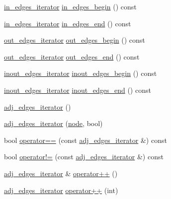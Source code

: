 \begin{DoxyCompactItemize}
\mbox{\hyperlink{classnode_a9a96be92add7c1a2771bcd0431ebf8ab}{in\+\_\+edges\+\_\+iterator}} \mbox{\hyperlink{classnode_a0c32377f370ae52ed2134ff8d4dac584}{in\+\_\+edges\+\_\+begin}} () const
\item 
\mbox{\hyperlink{classnode_a9a96be92add7c1a2771bcd0431ebf8ab}{in\+\_\+edges\+\_\+iterator}} \mbox{\hyperlink{classnode_a785cd330f8b4c5c47d3b6e936a7e744e}{in\+\_\+edges\+\_\+end}} () const
\item 
\mbox{\hyperlink{classnode_a90e17ed34de55072e8077f4367499a98}{out\+\_\+edges\+\_\+iterator}} \mbox{\hyperlink{classnode_a7dcb80df22118cea04f77ca8c952d9c2}{out\+\_\+edges\+\_\+begin}} () const
\item 
\mbox{\hyperlink{classnode_a90e17ed34de55072e8077f4367499a98}{out\+\_\+edges\+\_\+iterator}} \mbox{\hyperlink{classnode_a7ce2ba5195a63d4df6b44299a02a9378}{out\+\_\+edges\+\_\+end}} () const
\item 
\mbox{\hyperlink{classnode_a854d596611e6a3342090cce71cedf300}{inout\+\_\+edges\+\_\+iterator}} \mbox{\hyperlink{classnode_a8677f4dc2acfb64310de1ea866c17340}{inout\+\_\+edges\+\_\+begin}} () const
\item 
\mbox{\hyperlink{classnode_a854d596611e6a3342090cce71cedf300}{inout\+\_\+edges\+\_\+iterator}} \mbox{\hyperlink{classnode_ad4eec3efcc3c1e572b0492276e20980c}{inout\+\_\+edges\+\_\+end}} () const
\item 
\mbox{\hyperlink{classnode_a12cb1a2167f5f03c054de5e707d3156f}{adj\+\_\+edges\+\_\+iterator}} ()
\item 
\mbox{\hyperlink{classnode_a1b7aa43ddd3e7f392479c479400ebb75}{adj\+\_\+edges\+\_\+iterator}} (\mbox{\hyperlink{classnode}{node}}, bool)
\item 
bool \mbox{\hyperlink{classnode_a7ae20e73507364af0c1df22ecd0df444}{operator==}} (const \mbox{\hyperlink{classnode_abdd49248203010f2d5432dfef22d017a}{adj\+\_\+edges\+\_\+iterator}} \&) const
\item 
bool \mbox{\hyperlink{classnode_aa30fcffcf193cc94d3e1f3fe419ce42a}{operator!=}} (const \mbox{\hyperlink{classnode_abdd49248203010f2d5432dfef22d017a}{adj\+\_\+edges\+\_\+iterator}} \&) const
\item 
\mbox{\hyperlink{classnode_abdd49248203010f2d5432dfef22d017a}{adj\+\_\+edges\+\_\+iterator}} \& \mbox{\hyperlink{classnode_a5849d021a696f38d1b2e1d3d3372bbe7}{operator++}} ()
\item 
\mbox{\hyperlink{classnode_abdd49248203010f2d5432dfef22d017a}{adj\+\_\+edges\+\_\+iterator}} \mbox{\hyperlink{classnode_ac112a3065e69e4897d38c11980fe1789}{operator++}} (int)

\end{DoxyCompactItemize}

